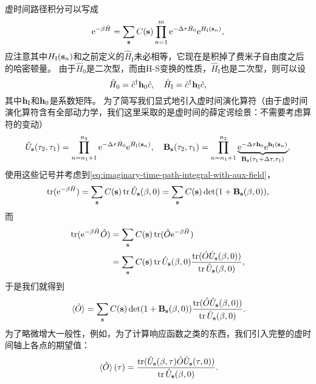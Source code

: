 \documentclass[hyperref, UTF8, a4paper]{ctexart}
\newcommand*{\ee}{\mathrm{e}}
\begin{document}
虚时间路径积分可以写成
\begin{equation}
    \ee^{-\beta \hat{H}} = \sum_{\vb{s}} C(\vb{s}) \prod_{n=1}^m \ee^{-\Delta \tau \hat{H}_0} \ee^{H_\text{I}(\vb{s}_n)}, 
    \label{eq:imaginary-time-path-integral-with-aux-field}
\end{equation}
应注意其中$H_\text{I}(\vb{s}_n)$和之前定义的$\hat{H}_\text{I}$未必相等，它现在是积掉了费米子自由度之后的哈密顿量。
由于$\hat{H}_0$是二次型，而由H-S变换的性质，$\hat{H}_\text{I}$也是二次型，则可以设
\begin{equation}
    \hat{H}_0 = \hat{c}^\dagger \vb{h}_0 \hat{c}, \quad \hat{H}_\text{I} = \hat{c}^\dagger \vb{h}_\text{I} \hat{c},
\end{equation}
其中$\vb{h}_\text{I}$和$\vb{h}_0$是系数矩阵。
为了简写我们显式地引入虚时间演化算符（由于虚时间演化算符含有全部动力学，我们这里采取的是虚时间的薛定谔绘景：不需要考虑算符的变动）
\begin{equation}
    \hat{U}_{\vb{s}}(\tau_2, \tau_1) = \prod_{n=n_1+1}^{n_2} \ee^{-\Delta \tau \hat{H}_0} \ee^{ \hat{H}_\text{I}(\vb{s}_n)}, \quad \vb{B}_{\vb{s}}(\tau_2, \tau_1) = \prod_{n=n_1+1}^{n_2} \underbrace{\ee^{-\Delta \tau \vb{h}_0} \ee^{\vb{h}_\text{I}(\vb{s}_n)}}_{\vb{B}_{\vb{s}}(\tau_1+\Delta \tau, \tau_1)},
\end{equation}
使用这些记号并考虑到\eqref{eq:imaginary-time-path-integral-with-aux-field}，
\[
    \trace(\ee^{-\beta \hat{H}}) = \sum_{\vb{s}} C(\vb{s}) \trace \hat{U}_{\vb{s}}(\beta, 0) = \sum_{\vb{s}} C(\vb{s}) \det(1 + \vb{B}_{\vb{s}}(\beta, 0)),
\]
而
\[
    \begin{aligned}
        \trace(\ee^{-\beta \hat{H}} \hat{O}) &= \sum_{\vb{s}} C(\vb{s}) \trace(\hat{O} \ee^{-\beta \hat{H}}) \\
        &= \sum_{\vb{s}} C(\vb{s}) \trace\hat{U}_{\vb{s}}(\beta, 0) \frac{\trace(\hat{O} \hat{U}_{\vb{s}}(\beta, 0))}{\trace \hat{U}_{\vb{s}}(\beta, 0)},
    \end{aligned} 
\]
于是我们就得到
\begin{equation}
    \expval*{\hat{O}} = \sum_{\vb{s}} C(\vb{s}) \det(1 + \vb{B}_{\vb{s}}(\beta, 0)) \frac{\trace(\hat{O} \hat{U}_{\vb{s}}(\beta, 0))}{\trace \hat{U}_{\vb{s}}(\beta, 0)}.
\end{equation}
为了略微增大一般性，例如，为了计算响应函数之类的东西，我们引入完整的虚时间轴上各点的期望值：
\begin{equation}
    \expval*{\hat{O}}(\tau) = \frac{\trace(\hat{U}_{\vb{s}}(\beta, \tau) \hat{O} \hat{U}_{\vb{s}}(\tau, 0))}{\trace \hat{U}_{\vb{s}}(\beta, 0)}.
\end{equation}
\end{document}
